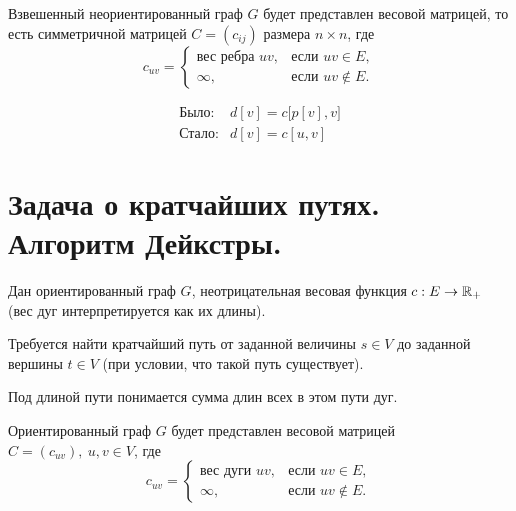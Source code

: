 \begin{note}
    Взвешенный неориентированный граф $ G $ будет представлен весовой матрицей, то есть симметричной матрицей $ C = (c_{ij}) $ размера $ n \times n $, где
    \[
        c_{uv} = \left\{\begin{array}{ll}
            \text{вес ребра }uv, & \text{если }uv \in E,     \\
            \infty,              & \text{если } uv \notin E.
        \end{array}\right.
    \]
    \begin{figure}[H]
        \centering
        \label{fig:fig_30}
    \end{figure}
    \[
        \begin{array}{ll}
            \text{Было:}  & d[v] = c\big[p[v],v\big] \\
            \text{Стало:} & d[v] = c[u,v]
        \end{array}
    \]
\end{note}

\section{Задача о кратчайших путях. Алгоритм Дейкстры.}

\begin{note}[ТГ постановка]
    Дан ориентированный граф $ G $, неотрицательная весовая функция $ c: E \rightarrow \mathbb{R}_+ $ (вес дуг интерпретируется как их длины).

    Требуется найти кратчайший путь от заданной величины $ s \in V $ до заданной вершины $ t \in V $ (при условии, что такой путь существует).
\end{note}

\begin{remark}
    Под длиной пути понимается сумма длин всех в этом пути дуг.
\end{remark}

\begin{note}
    Ориентированный граф $ G $ будет представлен весовой матрицей $ C = (c_{uv}), \ u,v \in V $, где
    \[
        c_{uv} = \left\{\begin{array}{ll}
            \text{вес дуги }uv, & \text{если }uv \in E,     \\
            \infty,             & \text{если } uv \notin E.
        \end{array}\right.
    \]
    \begin{figure}[H]
        \centering
        \label{fig:fig_31}
    \end{figure}
\end{note}

